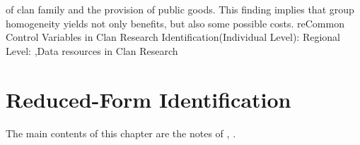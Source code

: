 \documentclass[12pt]{report}
\begin{document}
of clan family and the provision of public goods. This finding implies that group homogeneity yields not only benefits, but also some possible costs.
re{Common Control Variables in Clan Research Identification(Individual Level):
        Regional Level:
        }
\sep{Data resources in Clan Research}

\clearpage
\section{Reduced-Form Identification}
The main contents of this chapter are the notes of \cite{angrist2014mastering}, \cite{angrist2009mostly}.
\end{document}
